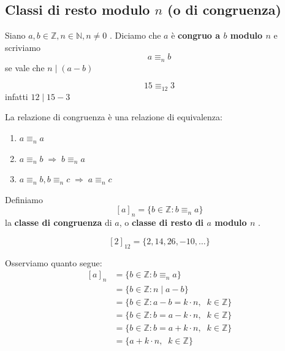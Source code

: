 \documentclass[
  a4paper,
]{article}
\providecommand{\tightlist}{%
  \setlength{\itemsep}{0pt}\setlength{\parskip}{0pt}}
\providecommand{\tightlist}{}
\begin{document}
\hypertarget{classi-di-resto-modulo-n-o-di-congruenza}{%
\subsection{\texorpdfstring{Classi di resto modulo \(n\) (o di
congruenza)}{Classi di resto modulo n (o di congruenza)}}\label{classi-di-resto-modulo-n-o-di-congruenza}}

\begin{definitionbox}
Siano \(a, b \in \mathbb{Z}, n \in \mathbb{N}, n \neq 0\) . Diciamo che
\(a\) è \textbf{congruo a \(b\) modulo \(n\)} e scriviamo \[
a \equiv_n b
\] se vale che \(n \mid (a-b)\)
\end{definitionbox}

\begin{examplebox}
\[
15 \equiv_{12} 3
\] infatti \(12 \mid 15 - 3\)
\end{examplebox}

\begin{propositionbox}
La relazione di congruenza è una relazione di equivalenza:

\begin{enumerate}
\def\labelenumi{\arabic{enumi}.}
\tightlist
\item
  \(a \equiv_n a\)
\item
  \(a \equiv_n b \;\Longrightarrow\; b \equiv_n a\)
\item
  \(a \equiv_n b, b \equiv_n c \;\Longrightarrow\; a \equiv_n c\)
\end{enumerate}
\end{propositionbox}

\begin{definitionbox}
Definiamo \[
\left[a\right]_n = \{b \in \mathbb{Z} : b \equiv_n a\}
\] la \textbf{classe di congruenza} di \(a\), o \textbf{classe di resto
di \(a\) modulo \(n\)} .
\end{definitionbox}

\begin{examplebox}
\[
[2]_{12} = \{2, 14, 26, -10, \dots \}
\]
\end{examplebox}

\begin{observationbox}
Osserviamo quanto segue: \[
\begin{aligned}
\left[a\right]_n &= \{b \in \mathbb{Z} : b \equiv_n a\} \\
&= \{b \in \mathbb{Z} : n \mid a-b\} \\
&= \{b \in \mathbb{Z} : a-b = k\cdot n,\;\; k \in \mathbb{Z}\} \\
&= \{b \in \mathbb{Z} : b = a - k\cdot n,\;\; k \in \mathbb{Z}\} \\
&= \{b \in \mathbb{Z} : b = a + k\cdot n,\;\; k \in \mathbb{Z}\} \\
&= \{a + k \cdot n,\;\; k \in \mathbb{Z}\} \\
\end{aligned}
\]
\end{observationbox}
\end{document}
